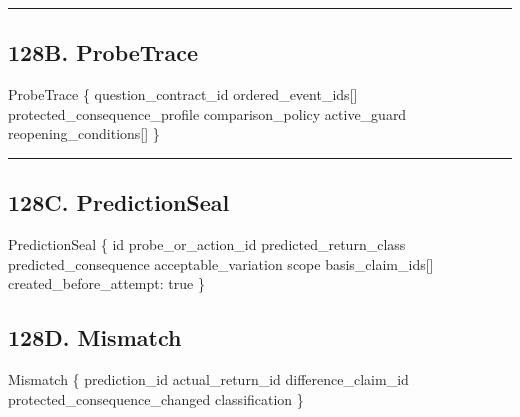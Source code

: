 \documentclass[
]{article}
\newenvironment{Shaded}{}{}
\newcommand{\NormalTok}[1]{#1}
\begin{document}
\begin{center}\rule{0.5\linewidth}{0.5pt}\end{center}

\subsection{128B. ProbeTrace}\label{probetrace}

\begin{Shaded}
\begin{Highlighting}[]
\NormalTok{ProbeTrace \{}
\NormalTok{    question\_contract\_id}
\NormalTok{    ordered\_event\_ids[]}
\NormalTok{    protected\_consequence\_profile}
\NormalTok{    comparison\_policy}
\NormalTok{    active\_guard}
\NormalTok{    reopening\_conditions[]}
\NormalTok{\}}
\end{Highlighting}
\end{Shaded}

\begin{center}\rule{0.5\linewidth}{0.5pt}\end{center}


\subsection{128C. PredictionSeal}\label{predictionseal}

\begin{Shaded}
\begin{Highlighting}[]
\NormalTok{PredictionSeal \{}
\NormalTok{    id}
\NormalTok{    probe\_or\_action\_id}
\NormalTok{    predicted\_return\_class}
\NormalTok{    predicted\_consequence}
\NormalTok{    acceptable\_variation}
\NormalTok{    scope}
\NormalTok{    basis\_claim\_ids[]}
\NormalTok{    created\_before\_attempt: true}
\NormalTok{\}}
\end{Highlighting}
\end{Shaded}

\subsection{128D. Mismatch}\label{mismatch}

\begin{Shaded}
\begin{Highlighting}[]
\NormalTok{Mismatch \{}
\NormalTok{    prediction\_id}
\NormalTok{    actual\_return\_id}
\NormalTok{    difference\_claim\_id}
\NormalTok{    protected\_consequence\_changed}
\NormalTok{    classification}
\NormalTok{\}}
\end{Highlighting}
\end{Shaded}
\end{document}
